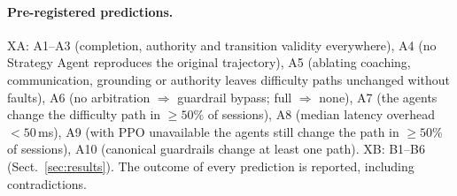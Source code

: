 \paragraph{Pre-registered predictions.} XA: A1--A3 (completion, authority and transition validity everywhere), A4 (no Strategy Agent reproduces the original trajectory), A5 (ablating coaching, communication, grounding or authority leaves difficulty paths unchanged without faults), A6 (no arbitration $\Rightarrow$ guardrail bypass; full $\Rightarrow$ none), A7 (the agents change the difficulty path in $\ge50\%$ of sessions), A8 (median latency overhead $<50$\,ms), A9 (with PPO unavailable the agents still change the path in $\ge50\%$ of sessions), A10 (canonical guardrails change at least one path). XB: B1--B6 (Sect.~\ref{sec:results}). The outcome of every prediction is reported, including contradictions.
